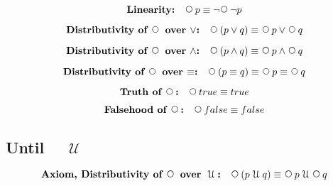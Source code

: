 \documentclass[12pt, fleqn, leqno]{article}
\newcommand{\Until}{\;\mathcal{U}\;}
\newcommand{\Next}{\;\,\text{\raisebox{3.5pt}{\circle{6}}}}
\newcommand{\spacer}{\vspace{-30pt}}
\begin{document}
\spacer

\begin{equation}\label{E:linearity}
\textbf{Linearity:}\quad \Next p \equiv \neg\Next\neg p
\end{equation}

\spacer

\begin{equation}\label{E:distNextOr}
\textbf{Distributivity of $\Next$ over $\lor$:}\quad \Next (p \lor q) \equiv \Next p \lor \Next q
\end{equation}

\spacer

\begin{equation}\label{E:distNextAnd}
\textbf{Distributivity of $\Next$ over $\land$:}\quad \Next (p \land q) \equiv \Next p \land \Next q
\end{equation}

\spacer

\begin{equation}\label{E:distNextEquiv}
\textbf{Distributivity of $\Next$ over $\equiv$:}\quad \Next (p \equiv q) \equiv \Next p \equiv \Next q
\end{equation}

\spacer

\begin{equation}\label{E:nextTruth}
\textbf{Truth of $\Next$:}\quad \Next true \equiv true
\end{equation}

\spacer

\begin{equation}\label{E:nextFalse}
\textbf{Falsehood of $\Next$:}\quad \Next false \equiv false
\end{equation}

\subsection*{Until $\quad\Until$}

\begin{equation}\label{E:distNextUntil}
\textbf{Axiom, Distributivity of $\Next$ over $\Until$:}\quad \Next (p \Until q) \equiv \Next p \Until \Next q
\end{equation}
\end{document}
